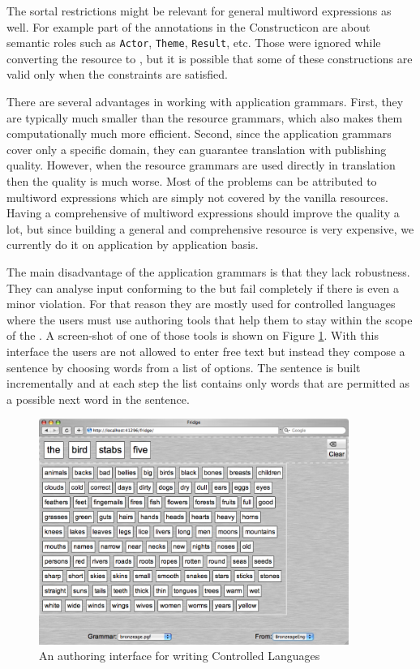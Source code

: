 \documentclass[output=paper]{langsci/langscibook}
\begin{document}
The sortal restrictions might be relevant for general
multiword expressions as well. For example part of the
annotations in the  Constructicon are about semantic roles
such as \texttt{Actor}, \texttt{Theme}, \texttt{Result}, etc.
Those were ignored while converting the resource to , but
it is possible that some of these constructions are valid only when
the constraints are satisfied.

There are several advantages in working with application grammars.
First, they are typically much smaller than the resource grammars, which
also makes them computationally much more efficient. Second, since
the application grammars cover only a specific domain, they can
guarantee translation with publishing quality. However, when the resource
grammars are used directly in translation then the quality is much worse.
Most of the problems can be attributed to multiword expressions
which are simply not covered by the vanilla resources. 
Having a comprehensive  of multiword expressions should
improve the quality a lot, but since building 
a general and comprehensive resource is very expensive, we currently
do it on application by application basis.

The main disadvantage of the application grammars is that they lack
robustness. They can analyse input conforming to the  but
fail completely if there is even a minor violation. For that reason
they are mostly used for controlled languages 
\citep{angelov:2009:icl} where the users must use 
authoring tools that help them to stay within the scope of the .
A screen-shot of one of those tools \citep{ranta2010tools}
is shown on Figure \ref{ang:fig:fridge}. With this interface the users
are not allowed to enter free text but instead they compose a sentence
by choosing words from a list of options. The sentence is built
incrementally and at each step the list contains only words
that are permitted as a possible next word in the sentence.

\begin{figure}
\center
\includegraphics[width=0.9\textwidth]{figures/fridge-poetry-screenshot}
\caption{An authoring interface for writing Controlled Languages}
\label{ang:fig:fridge}
\end{figure}
\end{document}
